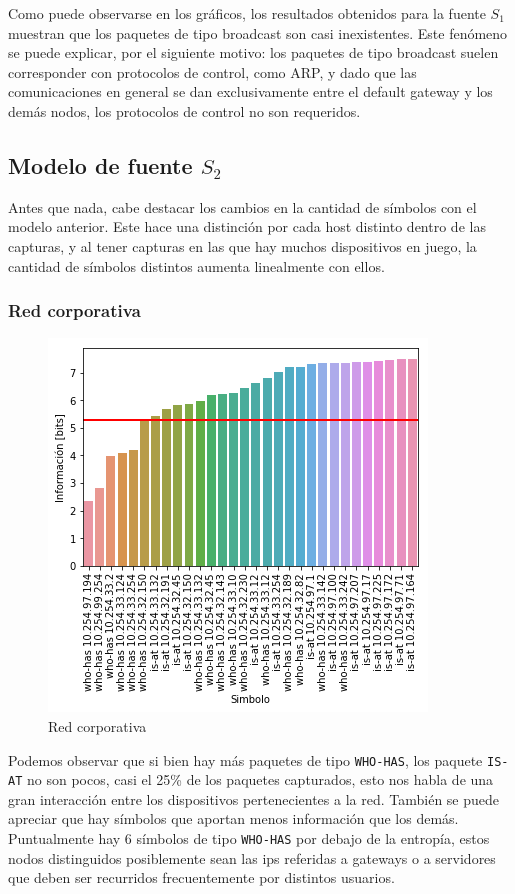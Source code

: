 Como puede observarse en los gráficos, los resultados obtenidos para la fuente $S_1$ muestran que los paquetes de tipo broadcast son casi inexistentes. Este fenómeno se puede explicar, por el siguiente motivo: los paquetes de tipo broadcast suelen corresponder con protocolos de control, como ARP, y dado que las comunicaciones en general se dan exclusivamente entre el default gateway y los demás nodos, los protocolos de control no son requeridos.

\subsection{Modelo de fuente \texorpdfstring{$S_2$}{S2}}

Antes que nada, cabe destacar los cambios en la cantidad de símbolos con el modelo anterior. Este hace una distinción por cada host distinto dentro de las capturas, y al tener capturas en las que hay muchos dispositivos en juego, la cantidad de símbolos distintos aumenta linealmente con ellos.

\subsubsection{Red corporativa}

\begin{figure}[H]
	\centering
	\includegraphics[width=.5\linewidth]{imagenes/despegar_hosts}
	\caption{Red corporativa}
\end{figure}



Podemos observar que si bien hay más paquetes de tipo \texttt{WHO-HAS}, los paquete \texttt{IS-AT} no son pocos, casi el 25\% de los paquetes capturados, esto nos habla de una gran interacción entre los dispositivos pertenecientes a la red. También se puede apreciar que hay símbolos que aportan menos información que los demás. Puntualmente hay 6 símbolos de tipo \texttt{WHO-HAS} por debajo de la entropía, estos nodos distinguidos posiblemente sean las ips referidas a gateways o a servidores que deben ser recurridos frecuentemente por distintos usuarios.

